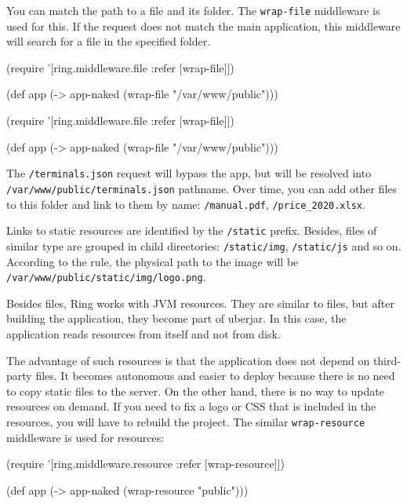 \fi


You can match the path to a file and its folder. The \verb|wrap-file| middleware is used for this. If the request does not match the main application, this middleware will search for a file in the specified folder.

\ifx\DEVICETYPE\MOBILE

\begin{clojure}
(require '[ring.middleware.file
           :refer [wrap-file]])

(def app
  (-> app-naked
      (wrap-file "/var/www/public")))
\end{clojure}

\else

\begin{clojure}
(require '[ring.middleware.file :refer [wrap-file]])

(def app (-> app-naked
             (wrap-file "/var/www/public")))
\end{clojure}

\fi

The \verb|/terminals.json| request will bypass the app, but will be resolved into \verb|/var/www/public/terminals.json| pathname. Over time, you can add other files to this folder and link to them by name: \verb|/manual.pdf|, \verb|/price_2020.xlsx|.

Links to static resources are identified by the \verb|/static| prefix. Besides, files of similar type are grouped in child directories: \verb|/static/img|, \verb|/static/js| and so on. According to the rule, the physical path to the image will be \verb|/var/www/public/static/img/logo.png|.

Besides files, Ring works with JVM resources. They are similar to files, but after building the application, they become part of uberjar. In this case, the application reads resources from itself and not from disk.

The advantage of such resources is that the application does not depend on third-party files. It becomes autonomous and easier to deploy because there is no need to copy static files to the server. On the other hand, there is no way to update resources on demand. If you need to fix a logo or CSS that is included in the resources, you will have to rebuild the project. The similar \verb|wrap-resource| middleware is used for resources:


\begin{clojure}
(require '[ring.middleware.resource
           :refer [wrap-resource]])

(def app (-> app-naked
             (wrap-resource "public")))
\end{clojure}

